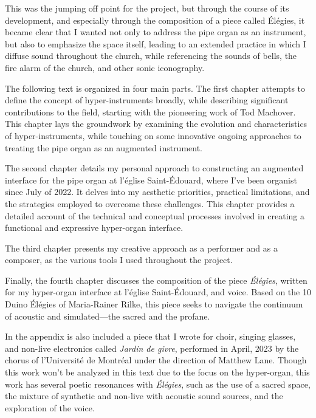 \documentclass[12pt,twoside,maitrise]{dms_ks}
\theoremstyle{definition}
\begin{document}
This was the jumping off point for the project, but through the course of its development, and especially through the composition of a piece called Élégies, it became clear that I wanted not only to address the pipe organ as an instrument, but also to emphasize the space itself, leading to an extended practice in which I diffuse sound throughout the church, while referencing the sounds of bells, the fire alarm of the church, and other sonic iconography. 

The following text is organized in four main parts. 
The first chapter attempts to define the concept of hyper-instruments broadly, while describing significant contributions to the field, starting with the pioneering work of Tod Machover. 
This chapter lays the groundwork by examining the evolution and characteristics of hyper-instruments, while touching on some innovative ongoing approaches to treating the pipe organ as an augmented instrument.

The second chapter details my personal approach to constructing an augmented interface for the pipe organ at l’église Saint-Édouard, where I've been organist since July of 2022. 
It delves into my aesthetic priorities, practical limitations, and the strategies employed to overcome these challenges. 
This chapter provides a detailed account of the technical and conceptual processes involved in creating a functional and expressive hyper-organ interface.

The third chapter presents my creative approach as a performer and as a composer, as the various tools I used throughout the project. 

Finally, the fourth chapter discusses the composition of the piece \textit{Élégies}, written for my hyper-organ interface at l’église Saint-Édouard, and voice. 
Based on the 10 Duino Élégies of Maria-Rainer Rilke, this piece seeks to navigate the continuum of acoustic and simulated---the sacred and the profane.

In the appendix is also included a piece that I wrote for choir, singing glasses, and non-live electronics called \textit{Jardin de givre}, performed in April, 2023 by the chorus of l'Université de Montréal under the direction of Matthew Lane. Though this work won't be analyzed in this text due to the focus on the hyper-organ, this work has several poetic resonances with \textit{Élégies}, such as the use of a sacred space, the mixture of synthetic and non-live with acoustic sound sources, and the exploration of the voice.

\end{document}
